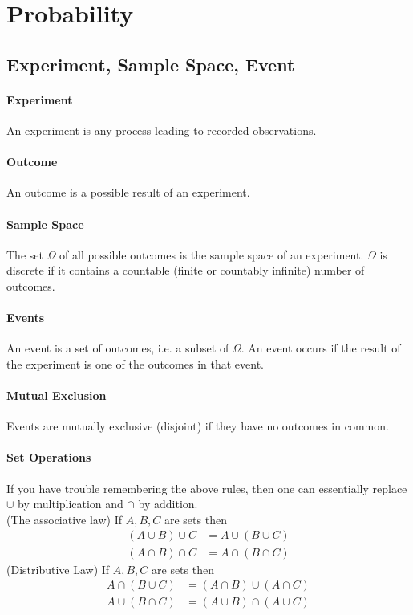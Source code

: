 \section{Probability}
\subsection{Experiment, Sample Space, Event}

\paragraph{Experiment}
An experiment is any process leading to recorded observations.

\paragraph{Outcome}
An outcome is a possible result of an experiment.

\paragraph{Sample Space}
The set \(\Omega\) of all possible outcomes is the sample space of an experiment. \(\Omega\) is discrete if it contains a countable (finite or countably infinite) number of outcomes.

\paragraph{Events}
An event is a set of outcomes, i.e. a subset of \(\Omega\). An event occurs if the result of the experiment is one of the outcomes in that event.

\paragraph{Mutual Exclusion}
Events are mutually exclusive (disjoint) if they have no outcomes in common.

\paragraph{Set Operations} 
If you have trouble remembering the above rules, then one can essentially replace \(\cup\) by multiplication and \(\cap\) by addition. \\
(The associative law) If \(A, B, C\) are sets then
\begin{align*}
    (A \cup B) \cup C & = A \cup (B \cup C) \\
    (A \cap B) \cap C & = A \cap (B \cap C)
\end{align*}
(Distributive Law) If \(A, B, C\) are sets then
\begin{align*}
    A \cap (B \cup C) & = (A \cap B) \cup (A \cap C) \\
    A \cup (B \cap C) & = (A \cup B) \cap (A \cup C)
\end{align*}


